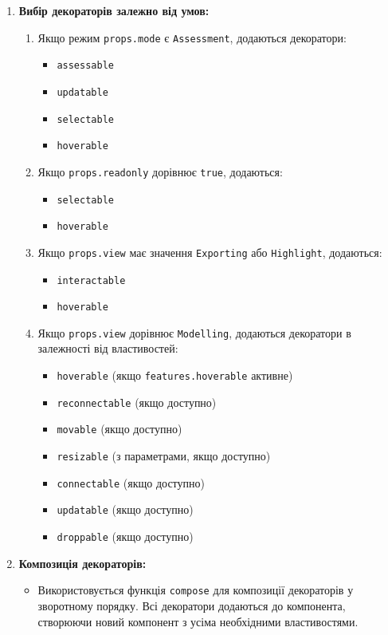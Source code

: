 \documentclass[oneside,14pt]{extarticle}
\begin{document}
\begin{normalsize}
\begin{enumerate}
    	\item \textbf{Вибір декораторів залежно від умов:}
    	\begin{enumerate}
    		\item Якщо режим \texttt{props.mode} є \texttt{Assessment}, додаються декоратори:
    		\begin{itemize}
    			\item \texttt{assessable}
    			\item \texttt{updatable}
    			\item \texttt{selectable}
    			\item \texttt{hoverable}
    		\end{itemize}
    		\item Якщо \texttt{props.readonly} дорівнює \texttt{true}, додаються:
    		\begin{itemize}
    			\item \texttt{selectable}
    			\item \texttt{hoverable}
    		\end{itemize}
    		\item Якщо \texttt{props.view} має значення \texttt{Exporting} або \texttt{Highlight}, додаються:
    		\begin{itemize}
    			\item \texttt{interactable}
    			\item \texttt{hoverable}
    		\end{itemize}
    		\item Якщо \texttt{props.view} дорівнює \texttt{Modelling}, додаються декоратори в залежності від властивостей:
    		\begin{itemize}
    			\item \texttt{hoverable} (якщо \texttt{features.hoverable} активне)
    			\item \texttt{reconnectable} (якщо доступно)
    			\item \texttt{movable} (якщо доступно)
    			\item \texttt{resizable} (з параметрами, якщо доступно)
    			\item \texttt{connectable} (якщо доступно)
    			\item \texttt{updatable} (якщо доступно)
    			\item \texttt{droppable} (якщо доступно)
    		\end{itemize}
    	\end{enumerate}
    	
    	\item \textbf{Композиція декораторів:}
    	\begin{itemize}
    		\item Використовується функція \texttt{compose} для композиції декораторів у зворотному порядку. Всі декоратори додаються до компонента, створюючи новий компонент з усіма необхідними властивостями.
    	\end{itemize}
    \end{enumerate}
    

\end{normalsize}
\end{document}
